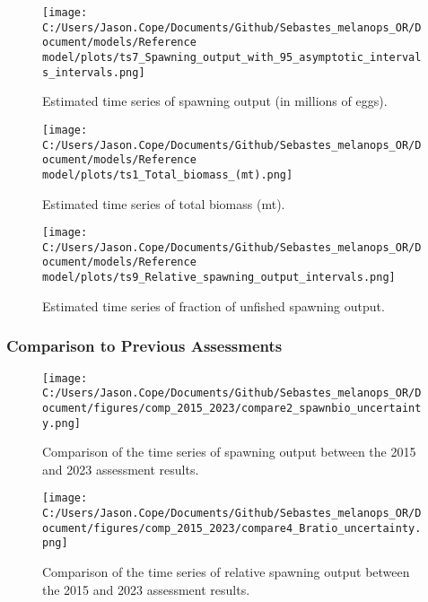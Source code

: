 \documentclass[11pt,
  english,
  letterpaper,
]{article}
\begin{document}
\begin{figure}
\centering
\texttt{[image: C:/Users/Jason.Cope/Documents/Github/Sebastes\_melanops\_OR/Document/models/Reference model/plots/ts7\_Spawning\_output\_with\_95\_asymptotic\_intervals\_intervals.png]}
\caption{Estimated time series of spawning output (in millions of eggs).\label{fig:ssb}}
\end{figure}

\newpage

\begin{figure}
\centering
\texttt{[image: C:/Users/Jason.Cope/Documents/Github/Sebastes\_melanops\_OR/Document/models/Reference model/plots/ts1\_Total\_biomass\_(mt).png]}
\caption{Estimated time series of total biomass (mt).\label{fig:tot-bio}}
\end{figure}

\newpage

\begin{figure}
\centering
\texttt{[image: C:/Users/Jason.Cope/Documents/Github/Sebastes\_melanops\_OR/Document/models/Reference model/plots/ts9\_Relative\_spawning\_output\_intervals.png]}
\caption{Estimated time series of fraction of unfished spawning output.\label{fig:depl}}
\end{figure}

\newpage

\hypertarget{comparison-to-previous-assessments}{%
\subsubsection{Comparison to Previous Assessments}\label{comparison-to-previous-assessments}}

\begin{figure}
\centering
\texttt{[image: C:/Users/Jason.Cope/Documents/Github/Sebastes\_melanops\_OR/Document/figures/comp\_2015\_2023/compare2\_spawnbio\_uncertainty.png]}
\caption{Comparison of the time series of spawning output between the 2015 and 2023 assessment results.\label{fig:comp-ssb}}
\end{figure}

\newpage

\begin{figure}
\centering
\texttt{[image: C:/Users/Jason.Cope/Documents/Github/Sebastes\_melanops\_OR/Document/figures/comp\_2015\_2023/compare4\_Bratio\_uncertainty.png]}
\caption{Comparison of the time series of relative spawning output between the 2015 and 2023 assessment results.\label{fig:comp-depl}}
\end{figure}
\end{document}
